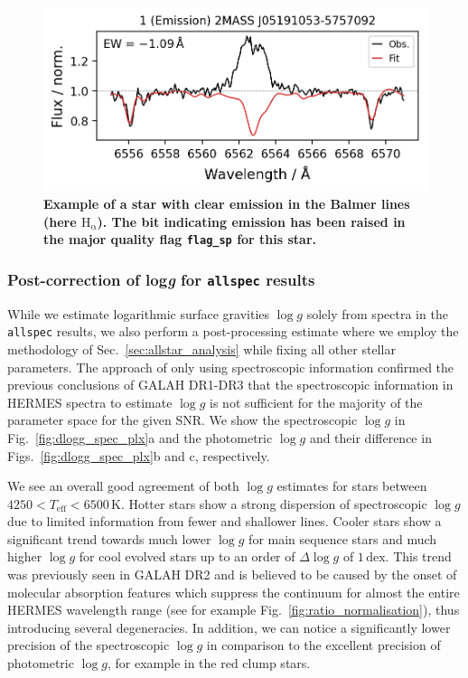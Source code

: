 \documentclass[
  journal=pasa,
  manuscript=research-paper, %
  year=2024,
  volume=37
]{cup-journal}
\newcommand{\logg}{$\log g$\xspace}
\begin{document}
\begin{figure}[ht]
 \centering
 \includegraphics[width=\textwidth]{figures/examples_flag_sp_1.png}
 \caption{\textbf{Example of a star with clear emission in the Balmer lines (here $\mathrm{H_\upalpha}$). The bit indicating emission has been raised in the major quality flag \texttt{flag\_sp} for this star.}} \label{fig:examples_flag_sp_1}
\end{figure}

\subsubsection{Post-correction of {log\textit{g}} for \texttt{allspec} results}

While we estimate logarithmic surface gravities \logg solely from spectra in the \texttt{allspec} results, we also perform a post-processing estimate where we employ the methodology of Sec.~\ref{sec:allstar_analysis} while fixing all other stellar parameters. The approach of only using spectroscopic information confirmed the previous conclusions of GALAH DR1-DR3 that the spectroscopic information in HERMES spectra to estimate \logg is not sufficient for the majority of the parameter space for the given SNR. We show the spectroscopic \logg in Fig.~\ref{fig:dlogg_spec_plx}a and the photometric \logg and their difference in Figs.~\ref{fig:dlogg_spec_plx}b and c, respectively.

We see an overall good agreement of both \logg estimates for stars between $4250 < T_\text{eff} < 6500\,\mathrm{K}$. Hotter stars show a strong dispersion of spectroscopic \logg due to limited information from fewer and shallower lines. Cooler stars show a significant trend towards much lower \logg for main sequence stars and much higher \logg for cool evolved stars up to an order of $\Delta \log g$ of $1\,\mathrm{dex}$. This trend was previously seen in GALAH DR2 \citep{Buder2018} and is believed to be caused by the onset of molecular absorption features which suppress the continuum for almost the entire HERMES wavelength range (see for example Fig.~\ref{fig:ratio_normalisation}), thus introducing several degeneracies. In addition, we can notice a significantly lower precision of the spectroscopic \logg in comparison to the excellent precision of photometric \logg, for example in the red clump stars.
\end{document}
